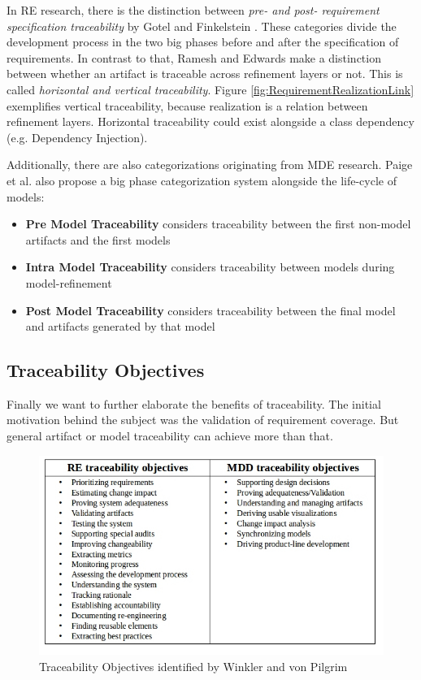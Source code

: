 \documentclass[runningheads,a4paper]{llncs}
\begin{document}
In RE research, there is the distinction between \textit{pre- and post- requirement specification traceability} by Gotel and Finkelstein \cite{GotelFinkelstein}.
These categories divide the development process in the two big phases before and after the specification of requirements.
In contrast to that, Ramesh and Edwards \cite{RameshEdwards} make a distinction between whether an artifact is traceable across refinement layers or not.
This is called \textit{horizontal and vertical traceability}.
Figure \ref{fig:RequirementRealizationLink} exemplifies vertical traceability, because realization is a relation between refinement layers.
Horizontal traceability could exist alongside a class dependency (e.g. Dependency Injection).

Additionally, there are also categorizations originating from MDE research. 
Paige et al. \cite{PaigeEtAl} also propose a big phase categorization system alongside the life-cycle of models:
\begin{itemize}

\item
\textbf{Pre Model Traceability}
considers traceability between the first non-model artifacts and the first models

\item
\textbf{Intra Model Traceability}
considers traceability between models during model-refinement

\item
\textbf{Post Model Traceability}
considers traceability between the final model and artifacts generated by that model

\end{itemize}


\subsection{Traceability Objectives}
\label{subsec:Traceability-Objectives}
Finally we want to further elaborate the benefits of traceability.
The initial motivation behind the subject was the validation of requirement coverage.
But general artifact or model traceability can achieve more than that.

\begin{figure}
\centering
\includegraphics[width=\textwidth]{TraceabilityObjectives.jpg}
\caption{Traceability Objectives identified by Winkler and von Pilgrim \cite{TraceabilitySurvey}}
\label{fig:TraceabilityObjectives}
\end{figure}
\end{document}
